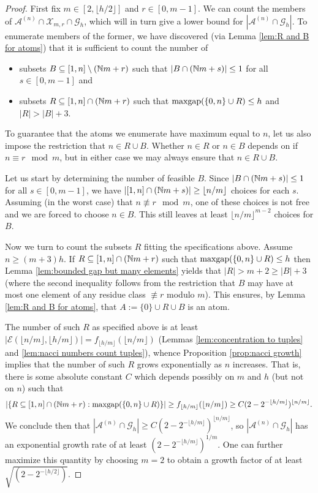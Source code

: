 \begin{proof}
First fix $m\in [2,\lfloor h/2 \rfloor]$ and $r\in [0,m-1]$.
We can count the members of $\mathcal{A}^{(n)}\cap \mathcal{X}_{m,r}\cap \mathcal{G}_h$, which will in turn give a lower bound for $|\mathcal{A}^{(n)}\cap \mathcal{G}_h|$.
To enumerate members of the former, we have discovered (via Lemma \ref{lem:R and B for atoms}) that it is sufficient to count the number of 
\begin{itemize}
	\item subsets $B\subseteq [1,n]\setminus(\mathbb{N} m + r)$ such that $|B\cap (\mathbb{N} m + s)| \le 1$ for all $s\in [0,m-1]$ and
	\item subsets $R\subseteq [1,n]\cap (\mathbb{N} m +r)$ such that $\operatorname{maxgap}(\{0,n\} \cup R) \le h$ and $|R| > |B|+3$.
\end{itemize}
To guarantee that the atoms we enumerate have maximum equal to $n$, let us also impose the restriction that $n\in R\cup B$.
Whether $n\in R$ or $n\in B$ depends on if $n\equiv r \mod m$, but in either case we may always ensure that $n\in R\cup B$.

Let us start by determining the number of feasible $B$.
Since $|B\cap (\mathbb{N} m + s)|\le 1$ for all $s\in [0,m-1]$, we have $|[1,n]\cap (\mathbb{N} m + s)| \ge \lfloor n/m \rfloor$ choices for each $s$.
Assuming (in the worst case) that $n\not\equiv r\mod m$, one of these choices is not free and we are forced to choose $n\in B$.
This still leaves at least $\lfloor n/m \rfloor ^{m-2}$ choices for $B$.

Now we turn to count the subsets $R$ fitting the specifications above.
Assume $n \ge (m+3)h$.
If $R\subseteq [1,n]\cap (\mathbb{N} m + r)$ such that $\operatorname{maxgap}(\{0,n\}\cup R)\le h$ then Lemma \ref{lem:bounded gap but many elements} yields that $|R| > m+2 \ge |B| + 3$ (where the second inequality follows from the restriction that $B$ may have at most one element of any residue class $\not\equiv r$ modulo $m$).
This ensures, by Lemma \ref{lem:R and B for atoms}, that $A:= \{0\}\cup R \cup B$ is an atom.  

The number of such $R$ as specified above is at least $|\mathcal{E}(\lfloor n/m \rfloor,\lfloor h/m\rfloor)| = f_{\lfloor h/m \rfloor}(\lfloor n/m \rfloor)$ (Lemmas \ref{lem:concentration to tuples} and \ref{lem:nacci numbers count tuples}), whence Proposition \ref{prop:nacci growth} implies that the number of such $R$ grows exponentially as $n$ increases.
That is, there is some absolute constant $C$ which depends possibly on $m$ and $h$ (but not on $n$) such that 
\[|\{R\subseteq [1,n]\cap (\mathbb{N} m +r): \operatorname{maxgap}(\{0,n\}\cup R)\}| \ge f_{\lfloor h/m \rfloor}(\lfloor n/m\rfloor) \ge C (2-2^{-\lfloor h/m\rfloor})^{\lfloor n/m \rfloor}. \]
We conclude then that $|\mathcal{A}^{(n)}\cap \mathcal{G}_h| \ge C(2-2^{-\lfloor h/m \rfloor})^{\lfloor n/m \rfloor}$, so $|\mathcal{A}^{(n)}\cap \mathcal{G}_h|$ has an exponential growth rate of at least $(2-2^{-\lfloor h/m\rfloor})^{1/m}$.
One can further maximize this quantity by choosing $m=2$ to obtain a growth factor of at least $\sqrt{(2-2^{-\lfloor h/2 \rfloor})}$.
\end{proof}

